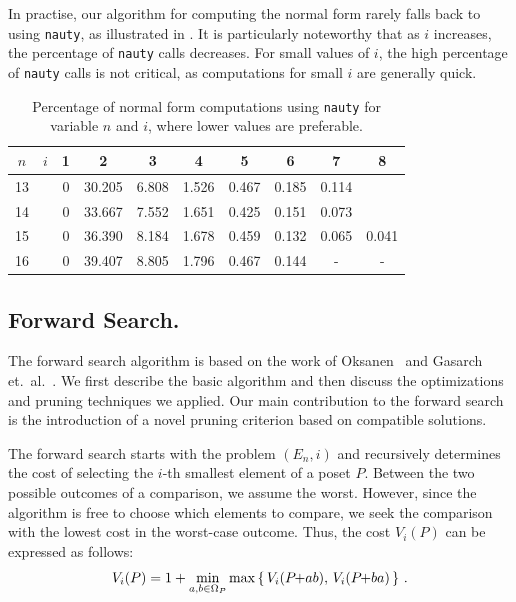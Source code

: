 \documentclass[a4paper,UKenglish,cleveref, autoref, thm-restate, anonymous]{lipics-v2021}
\newcommand{\pchild}[3]{{#1}\kern-1pt{+}{#2}{#3}}
\begin{document}
In practise, our algorithm for computing the normal form rarely falls back to using \texttt{nauty}, as illustrated in .
It is particularly noteworthy that as $i$ increases, the percentage of \texttt{nauty} calls decreases.
For small values of $i$, the high percentage of \texttt{nauty} calls is not critical, as computations for small $i$ are generally quick.

\begin{table}[!t]
  \renewcommand{\arraystretch}{1.1}
  \caption{Percentage of normal form computations using \texttt{nauty} for variable $n$ and $i$, where lower values are preferable.}
  \label{table:nauty-ratio}
  \centering
  \small
  \begin{tabular}{cr|cccccccc}
    $n$ & $i$ & 1 & 2      & 3     & 4     & 5     & 6     & 7     & 8     \\ \hline
    13  &     & 0 & 30.205 & 6.808 & 1.526 & 0.467 & 0.185 & 0.114 &       \\
    14  &     & 0 & 33.667 & 7.552 & 1.651 & 0.425 & 0.151 & 0.073 &       \\
    15  &     & 0 & 36.390 & 8.184 & 1.678 & 0.459 & 0.132 & 0.065 & 0.041 \\
    16  &     & 0 & 39.407 & 8.805 & 1.796 & 0.467 & 0.144 & -     & -     \\
  \end{tabular}%
\end{table}

\subsection{Forward Search.} \label{chapter:forward_search}
The forward search algorithm is based on the work of Oksanen~\cite{Oksanen2006} and Gasarch et.\ al\@.~\cite{Gasarch1996}.
We first describe the basic algorithm and then discuss the optimizations and pruning techniques we applied.
Our main contribution to the forward search is the introduction of a novel pruning criterion based on compatible solutions.

The forward search starts with the problem $(E_n, i)$ and recursively determines the cost of selecting the $i$-th smallest element of a poset $P$.
Between the two possible outcomes of a comparison, we assume the worst.
However, since the algorithm is free to choose which elements to compare, we seek the comparison with the lowest cost in the worst-case outcome.
Thus, the cost $V_i(P)$ can be expressed as follows:
\begin{equation}
  V_i(P) = 1 + \min_{a,b \in \Omega_P} \max \left\{ \,V_i(\pchild{P}{a}{b}),\, V_i(\pchild{P}{b}{a})\,\right\}\,\text{.}
\end{equation}
\end{document}
